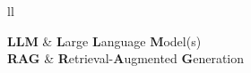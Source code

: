 \documentclass[
11pt, %
english, %
singlespacing, %
headsepline, %
]{style} %
\begin{document}
\begin{abbreviations}{ll} %

	\textbf{LLM} & \textbf{L}arge \textbf{L}anguage \textbf{M}odel(s)\\
	\textbf{RAG} & \textbf{R}etrieval-\textbf{A}ugmented \textbf{G}eneration\\

\end{abbreviations}












\end{document}
